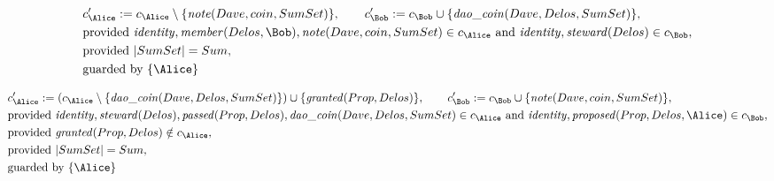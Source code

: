 \begin{align*}
&
c'_
{
\Alice
}
 := 
c_
{
\Alice
}
 \setminus 
\{
\mathit{\detokenize{
note
}}
(
Dave
,
coin
,
SumSet
)
\}
, \qquad 
c'_
{
\Bob
}
 := 
c_
{
\Bob
}
 \cup 
\{
\mathit{\detokenize{
dao_coin
}}
(
Dave
,
Delos
,
SumSet
)
\}
,\\
&
\text{provided } 
\mathit{\detokenize{
identity
}}
,
\mathit{\detokenize{
member
}}
(
Delos
,
\Bob
)
,
\mathit{\detokenize{
note
}}
(
Dave
,
coin
,
SumSet
)
 \in c_
{
\Alice
}
 \text{ and } 
\mathit{\detokenize{
identity
}}
,
\mathit{\detokenize{
steward
}}
(
Delos
)
 \in c_
{
\Bob
}
,\\
&
\text{provided } 
|
SumSet
|
=
Sum
,\\
&
\text{guarded by } \{
\Alice
\}
\end{align*}

\begin{align*}
&
c'_
{
\Alice
}
 := 
(c_
{
\Alice
}
 \setminus 
\{
\mathit{\detokenize{
dao_coin
}}
(
Dave
,
Delos
,
SumSet
)
\}
) \cup 
\{
\mathit{\detokenize{
granted
}}
(
Prop
,
Delos
)
\}
, \qquad 
c'_
{
\Bob
}
 := 
c_
{
\Bob
}
 \cup 
\{
\mathit{\detokenize{
note
}}
(
Dave
,
coin
,
SumSet
)
\}
,\\
&
\text{provided } 
\mathit{\detokenize{
identity
}}
,
\mathit{\detokenize{
steward
}}
(
Delos
)
,
\mathit{\detokenize{
passed
}}
(
Prop
,
Delos
)
,
\mathit{\detokenize{
dao_coin
}}
(
Dave
,
Delos
,
SumSet
)
 \in c_
{
\Alice
}
 \text{ and } 
\mathit{\detokenize{
identity
}}
,
\mathit{\detokenize{
proposed
}}
(
Prop
,
Delos
,
\Alice
)
 \in c_
{
\Bob
}
,\\
&
\text{provided } 
\mathit{\detokenize{
granted
}}
(
Prop
,
Delos
)
 \notin c_
{
\Alice
}
,\\
&
\text{provided } 
|
SumSet
|
=
Sum
,\\
&
\text{guarded by } \{
\Alice
\}
\end{align*}
